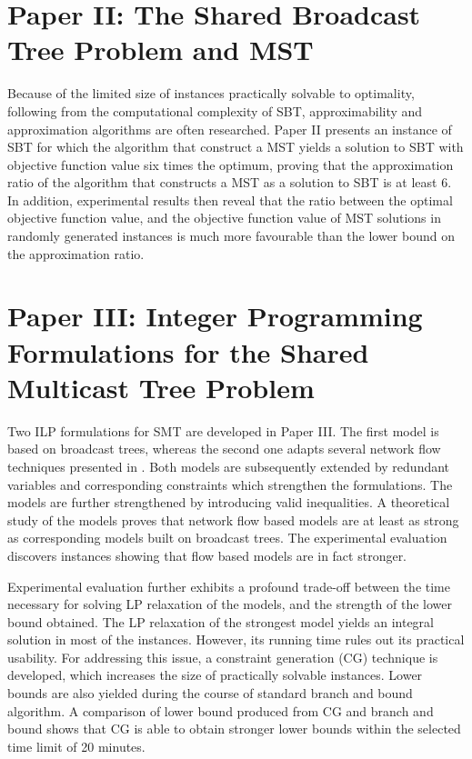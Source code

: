 %
%
\section{Paper II: The Shared Broadcast Tree Problem and MST}

Because of the limited size of instances practically solvable to optimality, following from the computational complexity of SBT, 
approximability and approximation algorithms are often researched.
Paper II presents an instance of SBT for which the algorithm that construct a MST yields a solution to SBT with objective function value six times the optimum, 
proving that the approximation ratio of the algorithm that constructs a MST as a solution to SBT is at least 6.
In addition, experimental results then reveal that the ratio between the optimal objective function value,
and the objective function value of MST solutions in randomly generated instances is much  more favourable than the lower bound on the approximation ratio.

%
%
\section{Paper III: Integer Programming Formulations for the Shared Multicast Tree Problem}

Two ILP formulations for SMT are developed in Paper III.
The first model is based on broadcast trees, whereas the second one adapts several network flow techniques presented in \cite{polzin01}.
Both models are subsequently extended by redundant variables and corresponding constraints which strengthen the formulations.
The models are further strengthened by introducing valid inequalities.
A theoretical study of the models proves that network flow based models are at least as strong as corresponding models built on broadcast trees.
The experimental evaluation discovers instances showing that flow based models are in fact stronger.

Experimental evaluation further exhibits a profound trade-off between the time necessary for solving LP relaxation of the models, and the strength of the lower bound obtained.
The LP relaxation of the strongest model yields an integral solution in most of the instances.
However, its running time rules out its practical usability.
For addressing this issue, a constraint generation (CG) technique is developed, which increases the size of practically solvable instances.
Lower bounds are also yielded during the course of standard branch and bound algorithm.
A comparison of lower bound produced from CG and branch and bound shows that CG is able to obtain stronger lower bounds within the selected time limit of 20 minutes.

